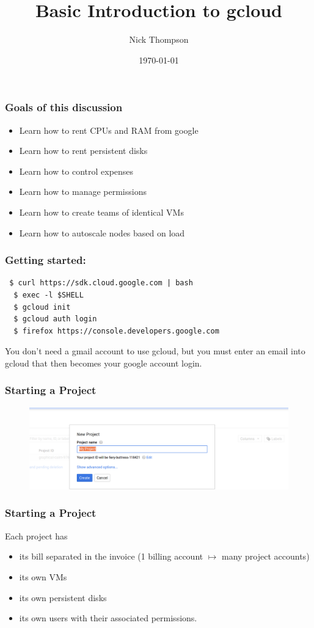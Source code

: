 \documentclass[9pt]{beamer}
\begin{document}
\title{Basic Introduction to gcloud}
\author{Nick Thompson} 
\date{\today}

\frame{\titlepage}

\begin{frame}[fragile]
  \frametitle{Goals of this discussion}
  \pause
  \begin{itemize}
  \item Learn how to rent CPUs and RAM from google
    \pause
  \item Learn how to rent persistent disks
    \pause
  \item Learn how to control expenses
    \pause
  \item Learn how to manage permissions
    \pause
  \item Learn how to create teams of identical VMs
    \pause
  \item Learn how to autoscale nodes based on load
  \end{itemize}
\end{frame}

\begin{frame}[fragile]
\frametitle{Getting started:}
\begin{verbatim}
 $ curl https://sdk.cloud.google.com | bash
  $ exec -l $SHELL
  $ gcloud init
  $ gcloud auth login
  $ firefox https://console.developers.google.com
\end{verbatim}
You don't need a gmail account to use gcloud, but you must enter an email into gcloud that then becomes your google account login.
\end{frame}

\begin{frame}[fragile]
  \frametitle{Starting a Project}
  \begin{figure}
    \includegraphics[scale=0.2]{figures/CreateProject.png}
  \end{figure}
\end{frame}

\begin{frame}[fragile]
  \frametitle{Starting a Project}
  Each project has
  \pause
  \begin{itemize}
  \item its bill separated in the invoice (1 billing account $\mapsto$ many project accounts)
    \pause
  \item its own VMs
    \pause
  \item its own persistent disks
    \pause
  \item its own users with their associated permissions.
  \end{itemize}
\end{frame}
\end{document}
